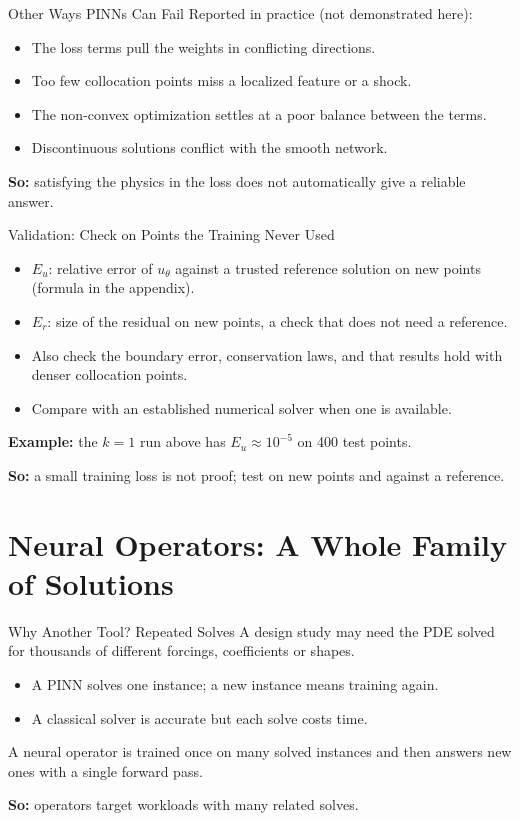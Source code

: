 \documentclass{ntuabeamer}
\begin{document}
\begin{frame}{Other Ways PINNs Can Fail}
  Reported in practice (not demonstrated here):
  \begin{itemize}
    \item The loss terms pull the weights in conflicting directions.
    \item Too few collocation points miss a localized feature or a shock.
    \item The non-convex optimization settles at a poor balance between the terms.
    \item Discontinuous solutions conflict with the smooth network.
  \end{itemize}
  \textbf{So:} satisfying the physics in the loss does not automatically give a reliable answer.
\end{frame}

\begin{frame}{Validation: Check on Points the Training Never Used}
  \begin{itemize}
    \item \(E_u\): relative error of \(u_\theta\) against a trusted reference solution on new points (formula in the appendix).
    \item \(E_r\): size of the residual on new points, a check that does not need a reference.
    \item Also check the boundary error, conservation laws, and that results hold with denser collocation points.
    \item Compare with an established numerical solver when one is available.
  \end{itemize}
  \textbf{Example:} the \(k=1\) run above has \(E_u\approx10^{-5}\) on 400 test points.

  \medskip
  \textbf{So:} a small training loss is not proof; test on new points and against a reference.
\end{frame}

\section{Neural Operators: A Whole Family of Solutions}

\begin{frame}{Why Another Tool? Repeated Solves}
  A design study may need the PDE solved for thousands of different forcings, coefficients or shapes.
  \begin{itemize}
    \item A PINN solves one instance; a new instance means training again.
    \item A classical solver is accurate but each solve costs time.
  \end{itemize}
  A neural operator is trained once on many solved instances and then answers new ones with a single forward pass.

  \medskip
  \textbf{So:} operators target workloads with many related solves.
\end{frame}
\end{document}
